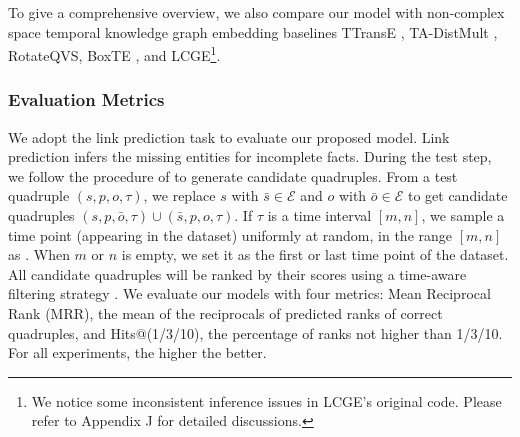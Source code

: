 \documentclass[letterpaper]{article} %
\begin{document}
To give a comprehensive overview, we also compare our model with non-complex space temporal knowledge graph embedding baselines TTransE \cite{garcia2018learning},  TA-DistMult \cite{leblay2018deriving}, RotateQVS\cite{chen2022rotateqvs}, BoxTE \cite{messner2022temporal}, and LCGE\cite{niu2022logic}\footnote{We notice some inconsistent inference issues in LCGE's original code. Please refer to Appendix J for detailed discussions.}.


\subsubsection{Evaluation Metrics}
We adopt the link prediction task to evaluate our proposed model. Link prediction infers the missing entities for incomplete facts. 
During the test step, we follow the procedure of \cite{xu2020tero} to generate candidate quadruples. From a test quadruple $(s,p,o, \tau)$, we replace $s$ with $\bar{s} \in \mathcal{E}$ and $o$ with $\bar{o} \in \mathcal{E}$ to get candidate quadruples $(s,p,\bar{o}, \tau) \cup (\bar{s},p,o, \tau)$.  If $\tau$ is a time interval $[m,n]$, we sample a time point (appearing in the dataset) uniformly at random, in the range $[m,n]$ as \cite{lacroix2019tensor}. When $m$ or $n$ is empty, we set it as the first or last time point of the dataset. All candidate quadruples will be ranked by their scores using a time-aware filtering strategy \cite{goel2020diachronic}. We evaluate our models with four metrics: Mean Reciprocal Rank (MRR), the mean of the reciprocals of predicted ranks of correct quadruples, and Hits@(1/3/10), the percentage of ranks not higher than 1/3/10. For all experiments, the higher the better. 
\end{document}
